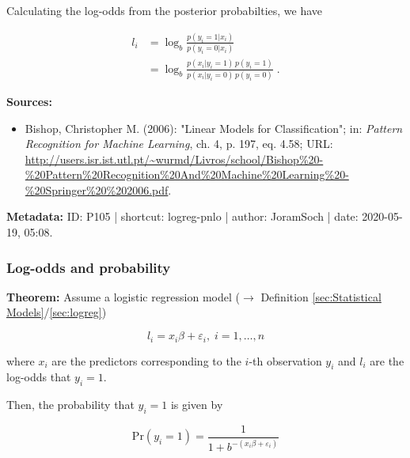 \documentclass[a4paper,12pt,twoside]{book}
\begin{document}
Calculating the log-odds from the posterior probabilties, we have

\begin{equation} \label{eq:logreg-pnlo-lodds-qed}
\begin{split}
l_i &= \log_b \frac{p(y_i=1|x_i)}{p(y_i=0|x_i)} \\
&= \log_b \frac{p(x_i|y_i=1) \, p(y_i=1)}{p(x_i|y_i=0) \, p(y_i=0)} \; .
\end{split}
\end{equation}


\vspace{1em}
\textbf{Sources:}
\begin{itemize}
\item Bishop, Christopher M. (2006): "Linear Models for Classification"; in: \textit{Pattern Recognition for Machine Learning}, ch. 4, p. 197, eq. 4.58; URL: \url{http://users.isr.ist.utl.pt/~wurmd/Livros/school/Bishop%20-%20Pattern%20Recognition%20And%20Machine%20Learning%20-%20Springer%20%202006.pdf}.
\end{itemize}


\vspace{1em}
\textbf{Metadata:} ID: P105 | shortcut: logreg-pnlo | author: JoramSoch | date: 2020-05-19, 05:08.
\vspace{1em}



\subsubsection[\textbf{Log-odds and probability}]{Log-odds and probability} \label{sec:logreg-lonp}
\setcounter{equation}{0}

\textbf{Theorem:} Assume a logistic regression model ($\rightarrow$ Definition \ref{sec:Statistical Models}/\ref{sec:logreg})

\begin{equation} \label{eq:logreg-lonp-logreg}
l_i = x_i \beta + \varepsilon_i, \; i = 1,\ldots,n
\end{equation}

where $x_i$ are the predictors corresponding to the $i$-th observation $y_i$ and $l_i$ are the log-odds that $y_i = 1$.

Then, the probability that $y_i = 1$ is given by

\begin{equation} \label{eq:logreg-lonp-prob}
\mathrm{Pr}(y_i = 1) = \frac{1}{1 + b^{-(x_i \beta + \varepsilon_i)}}
\end{equation}
\end{document}

